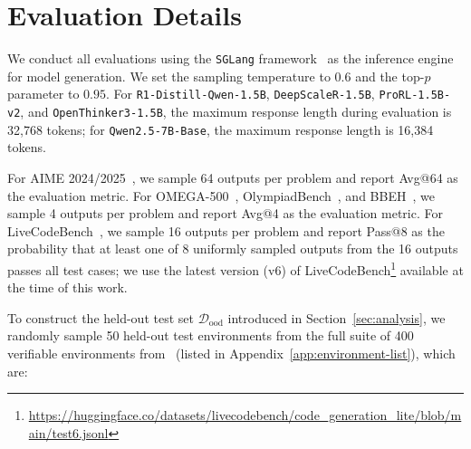 \documentclass{article}
\theoremstyle{plain}
\theoremstyle{definition}
\theoremstyle{remark}
\begin{document}
\section{Evaluation Details}
\label{app:eval-details}
We conduct all evaluations using the \texttt{SGLang} framework~\citep{sglang} as the inference engine for model generation.
We set the sampling temperature to $0.6$ and the top-$p$ parameter to $0.95$.
For \texttt{R1-Distill-Qwen-1.5B}, \texttt{DeepScaleR-1.5B}, \texttt{ProRL-1.5B-v2}, and \texttt{OpenThinker3-1.5B}, the maximum response length during evaluation is 32{,}768 tokens;
for \texttt{Qwen2.5-7B-Base}, the maximum response length is 16{,}384 tokens.

For AIME 2024/2025~\citep{aime}, we sample 64 outputs per problem and report Avg@64 as the evaluation metric.
For OMEGA-500~\citep{sun2025omega}, OlympiadBench~\citep{he2024olympiadbench}, and BBEH~\citep{kazemi2025bbeh}, we sample 4 outputs per problem and report Avg@4 as the evaluation metric.
For LiveCodeBench~\citep{jain2025lcb}, we sample 16 outputs per problem and report Pass@8 as the probability that at least one of 8 uniformly sampled outputs from the 16 outputs passes all test cases;
we use the latest version (v6) of LiveCodeBench\footnote{\url{https://huggingface.co/datasets/livecodebench/code_generation_lite/blob/main/test6.jsonl}} available at the time of this work.


To construct the held-out test set $\mathcal{D}_{\text{ood}}$ introduced in Section~\ref{sec:analysis}, we randomly sample 50 held-out test environments from the full suite of 400 verifiable environments from~\suite{} (listed in Appendix~\ref{app:environment-list}), which are:
\end{document}
